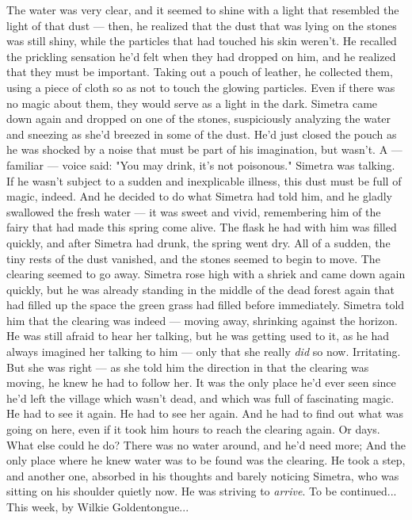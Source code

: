 The water was very clear, and it seemed to shine with a light that resembled the light of that dust --- then, he realized that the dust that was lying on the stones was still shiny, while the particles that had touched his skin weren't. 
He recalled the prickling sensation he'd felt when they had dropped on him, and he realized that they must be important. Taking out a pouch of leather, he collected them, using a piece of cloth so as not to touch the glowing particles. Even if there was no magic about them, they would serve as a light in the dark. 
Simetra came down again and dropped on one of the stones, suspiciously analyzing the water and sneezing as she'd breezed in some of the dust. 
He'd just closed the pouch as he was shocked by a noise that must be part of his imagination, but wasn't. A --- familiar --- voice said: "You may drink, it's not poisonous." 
Simetra was talking. 
If he wasn't subject to a sudden and inexplicable illness, this dust must be full of magic, indeed. 
And he decided to do what Simetra had told him, and he gladly swallowed the fresh water --- it was sweet and vivid, remembering him of the fairy that had made this spring come alive. The flask he had with him was filled quickly, and after Simetra had drunk, the spring went dry. 
All of a sudden, the tiny rests of the dust vanished, and the stones seemed to begin to move. The clearing seemed to go away. 
Simetra rose high with a shriek and came down again quickly, but he was already standing in the middle of the dead forest again that had filled up the space the green grass had filled before immediately. 
Simetra told him that the clearing was indeed --- moving away, shrinking against the horizon. He was still afraid to hear her talking, but he was getting used to it, as he had always imagined her talking to him --- only that she really \emph{did} so now. Irritating. 
But she was right --- as she told him the direction in that the clearing was moving, he knew he had to follow her. It was the only place he'd ever seen since he'd left the village which wasn't dead, and which was full of fascinating magic. 
He had to see it again. 
He had to see her again. 
And he had to find out what was going on here, even if it took him hours to reach the clearing again. Or days. 
What else could he do? There was no water around, and he'd need more; And the only place where he knew water was to be found was the clearing. 
He took a step, and another one, absorbed in his thoughts and barely noticing Simetra, who was sitting on his shoulder quietly now. 
He was striving to \emph{arrive}. 
To be continued...
This week, by Wilkie Goldentongue...
